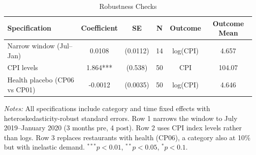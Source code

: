\begin{table}[htbp]
\centering
\caption{Robustness Checks}
\label{tab:robustness}
\begin{tabular}{lccccc}
\hline\hline
Specification & Coefficient & SE & N & Outcome & Outcome Mean \\
\hline
Narrow window (Jul--Jan) & 0.0108 & (0.0112) & 14 & log(CPI) & 4.657 \\
CPI levels & 1.864*** & (0.538) & 50 & CPI & 104.07 \\
Health placebo (CP06 vs CP01) & -0.0012 & (0.0035) & 50 & log(CPI) & 4.646 \\
\hline\hline
\end{tabular}
\begin{tablenotes}[flushleft]
\small
\item \textit{Notes:} All specifications include category and time fixed effects with heteroskedasticity-robust standard errors. Row 1 narrows the window to July 2019--January 2020 (3 months pre, 4 post). Row 2 uses CPI index levels rather than logs. Row 3 replaces restaurants with health (CP06), a category also at 10\% but with inelastic demand. $^{***}p<0.01$, $^{**}p<0.05$, $^{*}p<0.1$.
\end{tablenotes}
\end{table}
